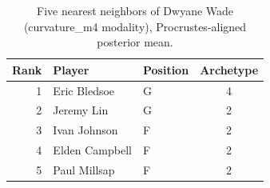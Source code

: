 \begin{table}[htbp]
  \centering\small
  \begin{tabular}{rllc}
    \toprule
    Rank & Player & Position & Archetype \\
    \midrule
    1 & Eric Bledsoe & G & 4 \\
    2 & Jeremy Lin & G & 2 \\
    3 & Ivan Johnson & F & 2 \\
    4 & Elden Campbell & F & 2 \\
    5 & Paul Millsap & F & 2 \\
    \bottomrule
  \end{tabular}
  \caption{Five nearest neighbors of Dwyane Wade (curvature_m4 modality), Procrustes-aligned posterior mean.}
  \label{tab:Dwyane_Wade_neighbors_curvature_m4}
\end{table}


